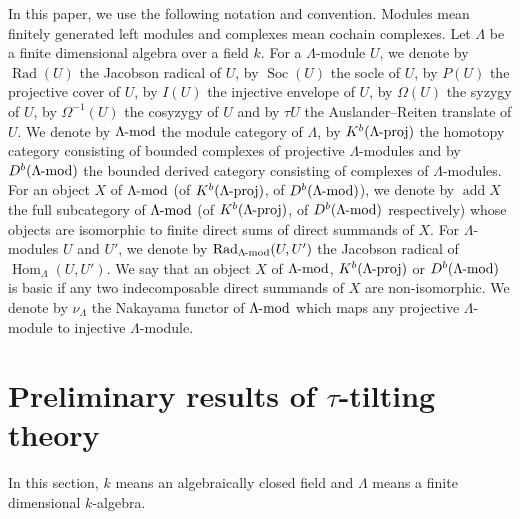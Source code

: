 \documentclass[pdftex,a4paper]{article}
\numberwithin{equation}{subsection}
\theoremstyle{definition}
\newcommand{\lmod}{\operatorname{\mathrm{\hspace{-2pt}-mod}}}
\newcommand{\lproj}{\operatorname{\mathrm{\hspace{-2pt}-proj}}}
\newcommand{\Soc}{{\operatorname{Soc}\nolimits}}
\newcommand{\Rad}{{\operatorname{Rad}\nolimits}}
\newcommand{\Hom}{\operatorname{Hom}\nolimits}
\newcommand{\add}{\operatorname{\mathrm{add}}}
\begin{document}
In this paper, we use the following notation and convention.
Modules mean finitely generated left modules and complexes mean cochain complexes.
Let \(\Lambda\) be a finite dimensional algebra over a field \(k\).
For a \(\Lambda\)-module \(U\), we denote by \(\Rad(U)\) the Jacobson radical of \(U\), by \(\Soc(U)\) the socle of \(U\), by \(P(U)\) the projective cover of \(U\), by \(I(U)\) the injective envelope of \(U\), by \(\Omega(U)\) the syzygy of \(U\), by \(\Omega^{-1}(U)\) the cosyzygy of \(U\) and by \(\tau U\) the Auslander--Reiten translate of \(U\).
We denote by \(\Lambda\lmod\) the module category of \(\Lambda\), by \(K^b(\Lambda\lproj)\) the homotopy category consisting of bounded complexes of projective \(\Lambda\)-modules and by \(D^b(\Lambda\lmod)\) the bounded derived category consisting of complexes of \(\Lambda\)-modules.
For an object \(X\) of \(\Lambda\lmod\) (of \(K^b(\Lambda\lproj)\), of \(D^b(\Lambda\lmod)\)),
we denote by \(\add X\) the full subcategory of \(\Lambda\lmod\) (of \(K^b(\Lambda\lproj)\), of \(D^b(\Lambda\lmod)\) respectively) whose objects are isomorphic to finite direct sums of direct summands of \(X\).
For \(\Lambda\)-modules \(U\) and \(U'\), we denote by \(\Rad_{\Lambda\lmod}(U,U')\) the Jacobson radical of \(\Hom_\Lambda(U,U')\).
We say that an object \(X\) of \(\Lambda\lmod\), \(K^b(\Lambda\lproj)\) or \(D^b(\Lambda\lmod)\) is basic if any two indecomposable direct summands of \(X\) are non-isomorphic.
We denote by \(\nu_\Lambda\) the Nakayama functor of \(\Lambda\lmod\) which maps any projective \(\Lambda\)-module to injective \(\Lambda\)-module.

\section{Preliminary results of \texorpdfstring{\(\tau\)}{tau}-tilting theory}
In this section, \(k\) means an algebraically  closed field and \(\Lambda\) means a finite dimensional \(k\)-algebra.
\end{document}
